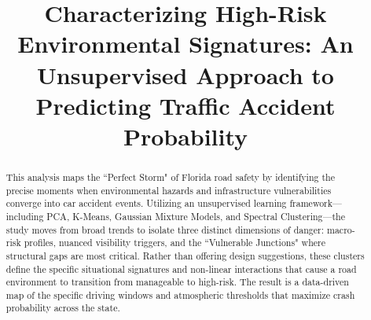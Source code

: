 \documentclass[conference]{IEEEtran}
\begin{document}
\title{Characterizing High-Risk Environmental Signatures: An Unsupervised Approach to Predicting Traffic Accident Probability}

\author{
	}

\maketitle
\renewcommand{\abstractname}{Summary}
\begin{abstract}
This analysis maps the ``Perfect Storm" of Florida road safety by identifying the precise moments when environmental hazards and infrastructure vulnerabilities converge into car accident events. Utilizing an unsupervised learning framework—including PCA, K-Means, Gaussian Mixture Models, and Spectral Clustering—the study moves from broad trends to isolate three distinct dimensions of danger: macro-risk profiles, nuanced visibility triggers, and the ``Vulnerable Junctions" where structural gaps are most critical. Rather than offering design suggestions, these clusters define the specific situational signatures and non-linear interactions that cause a road environment to transition from manageable to high-risk. The result is a data-driven map of the specific driving windows and atmospheric thresholds that maximize crash probability across the state.
\end{abstract}
\end{document}
